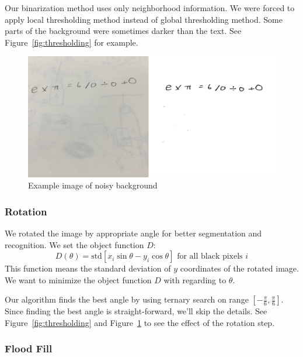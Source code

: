 \documentclass[10pt,twocolumn,letterpaper]{article}
\begin{document}
Our binarization method uses only neighborhood information.
We were forced to apply local thresholding method instead of global thresholding method.
Some parts of the background were sometimes darker than the text.
See Figure~\ref{fig:thresholding} for example.

\begin{figure}[h]
\begin{center}
   \includegraphics[width=0.97\linewidth]{img/noisybg.png}
\end{center}
\caption{Example image of noisy background}
\label{fig:noisy}
\end{figure}

\subsubsection{Rotation}

We rotated the image by appropriate angle for better segmentation and recognition.
We set the object function $D$:
\begin{equation}
\label{eq:rotation-objective}
D(\theta) = \textrm{std}[x_i \sin{\theta} - y_i \cos{\theta}] \textrm{ for all black pixels } i
\end{equation}
This function means the standard deviation of $y$ coordinates of the rotated image.
We want to minimize the object function $D$ with regarding to $\theta$.

Our algorithm finds the best angle by using ternary search on range $[-\frac{\pi}{6}, \frac{\pi}{6}]$.
Since finding the best angle is straight-forward, we'll skip the details.
See Figure~\ref{fig:thresholding} and Figure~\ref{fig:noisy} to see the effect of the rotation step.



\subsubsection{Flood Fill}
\end{document}
